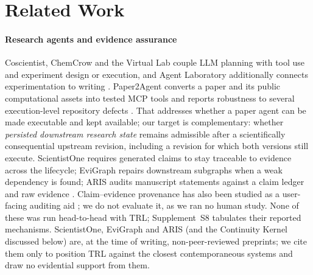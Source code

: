 \documentclass[cmc,article,submit,moreauthors,pdftex]{Definitions/tsp}
\newcommand{\suppl}[1]{Supplement~#1}
\begin{document}
\section{Related Work}
\label{sec:related}
\paragraph{Research agents and evidence assurance}
Coscientist, ChemCrow and the Virtual Lab couple LLM planning with tool use and experiment design or execution, and Agent Laboratory additionally connects experimentation to writing \cite{boiko2023coscientist,bran2024chemcrow,swanson2025virtuallab,schmidgall2025agentlab}. Paper2Agent converts a paper and its public computational assets into tested MCP tools and reports robustness to several execution-level repository defects \cite{miao2026paper2agent}. That addresses whether a paper agent can be made executable and kept available; our target is complementary: whether \emph{persisted downstream research state} remains admissible after a scientifically consequential upstream revision, including a revision for which both versions still execute. ScientistOne requires generated claims to stay traceable to evidence across the lifecycle; EviGraph repairs downstream subgraphs when a weak dependency is found; ARIS audits manuscript statements against a claim ledger and raw evidence \cite{meng2026scientistone,ren2026evigraph,yang2026aris}. Claim--evidence provenance has also been studied as a user-facing auditing aid \cite{martinboyle2026papertrail}; we do not evaluate it, as we ran no human study. None of these was run head-to-head with TRL; \suppl{S8} tabulates their reported mechanisms. ScientistOne, EviGraph and ARIS (and the Continuity Kernel discussed below) are, at the time of writing, non-peer-reviewed preprints; we cite them only to position TRL against the closest contemporaneous systems and draw no evidential support from them.
\end{document}
